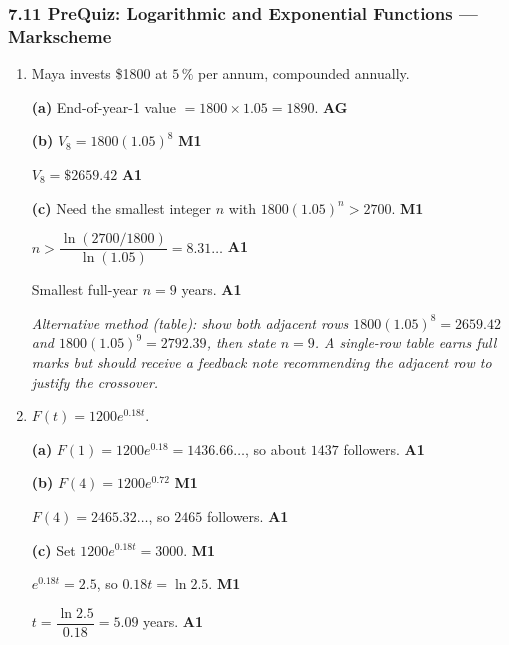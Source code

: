 \documentclass[12pt, twoside]{article}
\begin{document}
\subsubsection*{7.11 PreQuiz: Logarithmic and Exponential Functions ---
Markscheme}

\begin{enumerate}[itemsep=0.3cm]

\item[1.] [Maximum mark: 6]

Maya invests \$1800 at $5\,\%$ per annum, compounded annually.

\medskip

\textbf{(a)} End-of-year-1 value $=1800 \times 1.05 = 1890$.
\hfill \textbf{AG}

\medskip

\textbf{(b)} $V_8 = 1800(1.05)^8$ \hfill \textbf{M1}

$V_8 = \$2659.42$ \hfill \textbf{A1}

\medskip

\textbf{(c)} Need the smallest integer $n$ with
$1800(1.05)^n > 2700$. \hfill \textbf{M1}

$n > \dfrac{\ln(2700/1800)}{\ln(1.05)} = 8.31\ldots$
\hfill \textbf{A1}

Smallest full-year $n=9$ years. \hfill \textbf{A1}

\emph{Alternative method (table): show both adjacent rows
$1800(1.05)^{8}=2659.42$ and $1800(1.05)^{9}=2792.39$, then state
$n=9$. A single-row table earns full marks but should receive a
feedback note recommending the adjacent row to justify the
crossover.}

\newpage

\item[2.] [Maximum mark: 6]

$F(t)=1200e^{0.18t}$.

\medskip

\textbf{(a)} $F(1)=1200e^{0.18}=1436.66\ldots$, so about
$1437$ followers. \hfill \textbf{A1}

\medskip

\textbf{(b)} $F(4)=1200e^{0.72}$ \hfill \textbf{M1}

$F(4)=2465.32\ldots$, so $2465$ followers. \hfill \textbf{A1}

\medskip

\textbf{(c)} Set $1200e^{0.18t}=3000$. \hfill \textbf{M1}

$e^{0.18t}=2.5$, so $0.18t=\ln 2.5$. \hfill \textbf{M1}

$t=\dfrac{\ln 2.5}{0.18}=5.09$ years. \hfill \textbf{A1}

\end{enumerate}
\end{document}
